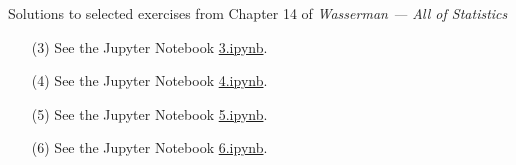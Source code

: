 \documentclass[10pt]{article}
\begin{document}
\noindent \large{Solutions to selected exercises from Chapter 14 of
\emph{Wasserman --- All of Statistics}}

\begin{enumerate}

\item[(3)]
See the Jupyter Notebook
\href{https://github.com/ajrasmus/some_of_statistics/blob/main/chapter_14/3.ipynb}{3.ipynb}.

\item[(4)]
See the Jupyter Notebook
\href{https://github.com/ajrasmus/some_of_statistics/blob/main/chapter_14/4.ipynb}{4.ipynb}.

\item[(5)]
See the Jupyter Notebook
\href{https://github.com/ajrasmus/some_of_statistics/blob/main/chapter_14/5.ipynb}{5.ipynb}.

\item[(6)]
See the Jupyter Notebook
\href{https://github.com/ajrasmus/some_of_statistics/blob/main/chapter_14/6.ipynb}{6.ipynb}.

\end{enumerate}
\end{document}

